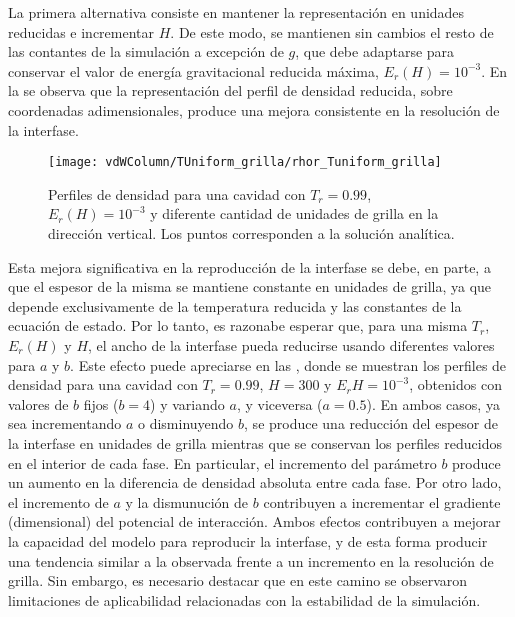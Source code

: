 La primera alternativa consiste en mantener la representaci\'on en unidades reducidas e incrementar $H$. De este modo, se mantienen sin cambios el resto de las contantes de la simulaci\'on a excepci\'on de $g$, que debe adaptarse para conservar el valor de energ\'ia gravitacional reducida m\'axima, $E_r(H) = 10^{-3}$. En la  se observa que la representaci\'on del perfil de densidad reducida, sobre coordenadas adimensionales, produce una mejora consistente en la resoluci\'on de la interfase.

\begin{figure}[ht]
	\centering
	\texttt{[image: vdWColumn/TUniform\_grilla/rhor\_Tuniform\_grilla]}
	\caption{Perfiles de densidad para una cavidad con $T_r = 0.99$, $E_r(H) = 10^{-3}$ y diferente cantidad de unidades de grilla en la direcci\'on vertical. Los puntos corresponden a la soluci\'on anal\'itica.}
	\label{fig:vdWColumn_rhor_grilla}
\end{figure}

Esta mejora significativa en la reproducci\'on de la interfase se debe, en parte, a que el espesor de la misma se mantiene constante en unidades de grilla, ya que depende exclusivamente de la temperatura reducida y las constantes de la ecuaci\'on de estado. Por lo tanto, es razonabe esperar que, para una misma $T_r$, $E_r(H)$ y $H$, el ancho de la interfase pueda reducirse usando diferentes valores para $a$ y $b$. Este efecto puede apreciarse en las , donde se muestran los perfiles de densidad para una cavidad con $T_r=0.99$, $H=300$ y $E_r{H}=10^{-3}$, obtenidos con valores de $b$ fijos ($b=4$) y variando $a$, y viceversa ($a=0.5$). En ambos casos, ya sea incrementando $a$ o disminuyendo $b$, se produce una reducci\'on del espesor de la interfase en unidades de grilla mientras que se conservan los perfiles reducidos en el interior de cada fase. En particular, el incremento del par\'ametro $b$ produce un aumento en la diferencia de densidad absoluta entre cada fase. Por otro lado, el incremento de $a$ y la dismunuci\'on de $b$ contribuyen a incrementar el gradiente (dimensional) del potencial de interacci\'on. Ambos efectos contribuyen a mejorar la capacidad del modelo \pp{} para reproducir la interfase, y de esta forma producir una tendencia similar a la observada frente a un incremento en la resoluci\'on de grilla. Sin embargo, es necesario destacar que en este camino se observaron limitaciones de aplicabilidad relacionadas con la estabilidad de la simulaci\'on.

